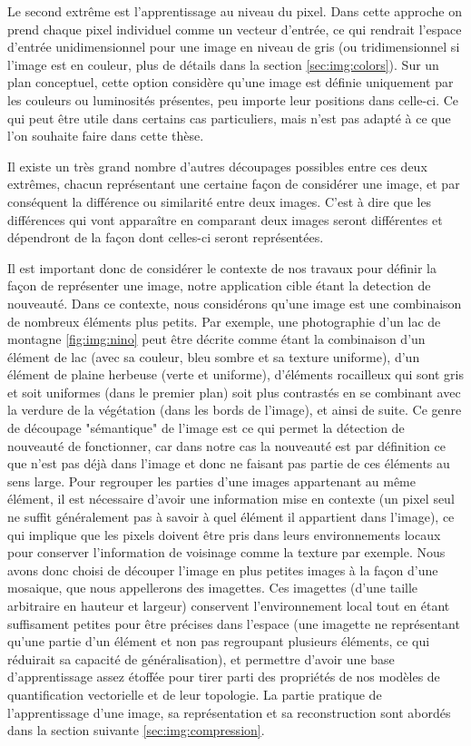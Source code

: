 	Le second extrême est l'apprentissage au niveau du pixel. Dans cette approche on prend chaque pixel individuel comme un vecteur d'entrée, ce qui rendrait l'espace d'entrée unidimensionnel pour une image en niveau de gris (ou tridimensionnel si l'image est en couleur, plus de détails dans la section \ref{sec:img:colors}). Sur un plan conceptuel, cette option considère qu'une image est définie uniquement par les couleurs ou luminosités présentes, peu importe leur positions dans celle-ci. Ce qui peut être utile dans certains cas particuliers, mais n'est pas adapté à ce que l'on souhaite faire dans cette thèse.

	Il existe un très grand nombre d'autres découpages possibles entre ces deux extrêmes, chacun représentant une certaine façon de considérer une image, et par conséquent la différence ou similarité entre deux images. C'est à dire que les différences qui vont apparaître en comparant deux images seront différentes et dépendront de la façon dont celles-ci seront représentées.

	Il est important donc de considérer le contexte de nos travaux pour définir la façon de représenter une image, notre application cible étant la detection de nouveauté. Dans ce contexte, nous considérons qu'une image est une combinaison de nombreux éléments plus petits. Par exemple, une photographie d'un lac de montagne \ref{fig:img:nino} peut être décrite comme étant la combinaison d'un élément de lac (avec sa couleur, bleu sombre et sa texture uniforme), d'un élément de plaine herbeuse (verte et uniforme), d'éléments rocailleux qui sont gris et soit uniformes (dans le premier plan) soit plus contrastés en se combinant avec la verdure de la végétation (dans les bords de l'image), et ainsi de suite. Ce genre de découpage "sémantique" de l'image est ce qui permet la détection de nouveauté  de fonctionner, car dans notre cas la nouveauté est par définition ce que n'est pas déjà dans l'image et donc ne faisant pas partie de ces éléments au sens large. Pour regrouper les parties d'une images appartenant au même élément, il est nécessaire d'avoir une information mise en contexte (un pixel seul ne suffit généralement pas à savoir à quel élément il appartient dans l'image), ce qui implique que les pixels doivent être pris dans leurs environnements locaux pour conserver l'information de voisinage comme la texture par exemple. Nous avons donc choisi de découper l'image en plus petites images à la façon d'une mosaique, que nous appellerons des imagettes. Ces imagettes (d'une taille arbitraire en hauteur et largeur) conservent l'environnement local tout en étant suffisament petites pour être précises dans l'espace (une imagette ne représentant qu'une partie d'un élément et non pas regroupant plusieurs éléments, ce qui réduirait sa capacité de généralisation), et permettre d'avoir une base d'apprentissage assez étoffée pour tirer parti des propriétés de nos modèles de quantification vectorielle et de leur topologie. La partie pratique de l'apprentissage d'une image, sa représentation et sa reconstruction sont abordés dans la section suivante \ref{sec:img:compression}.


